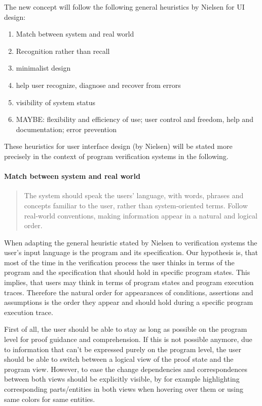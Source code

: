 \documentclass{article}
\begin{document}
The new concept will follow the following general heuristics by Nielsen for UI 
design:
\begin{enumerate}
 \item Match between system and real world
 \item Recognition rather than recall
 \item minimalist design
 \item help user recognize, diagnose and recover from errors
 \item visibility of system status
 \item MAYBE: flexibility and efficiency of use; user control and freedom, help 
and documentation; error prevention
\end{enumerate}

These heuristics for user interface design (by Nielsen) will be stated more 
precisely in the context of program verification systems in the following.

\paragraph{Match between system and real world}
\begin{quote}
 The system should speak the users' language, with words, phrases and concepts 
familiar to the user, rather than system-oriented terms. Follow real-world 
conventions, making information appear in a natural and logical order.
\end{quote}

When adapting the general heuristic stated by Nielsen to verification systems 
the user's input language is the program and its specification. Our hypothesis 
is, that most of the time in the verification process the user thinks in 
terms of the program and the specification that should hold in specific 
program states. This implies, that users may think in terms of program states 
and program execution traces. Therefore the natural order for appearances of 
conditions, assertions and assumptions is the order they appear and 
should hold during a specific program execution trace.

First of all, the user should be able to stay as long as possible on the 
program level for proof guidance and comprehension. If this is not possible 
anymore, due to information that can't be expressed purely on the program 
level, the user should be able to switch between a logical view of the proof 
state and the program view. However, to ease the change dependencies and 
correspondences between both views should be explicitly visible, by for example 
highlighting corresponding parts/entities in both views when hovering over them 
or using same colors for same entities.
\end{document}
